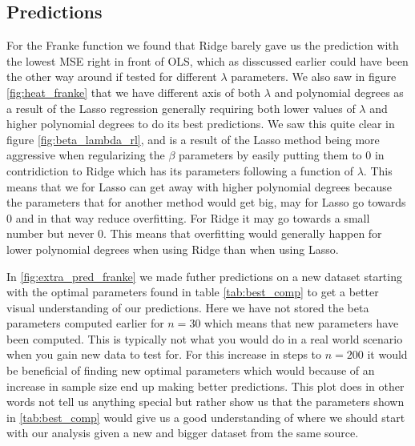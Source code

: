 \documentclass[12pt]{article}
\begin{document}
\subsection{Predictions}
For the Franke function we found that Ridge barely gave us the prediction with the lowest MSE right in front of OLS, which as disscussed earlier could have been the other way around if tested for different $\lambda$ parameters. We also saw in figure \ref{fig:heat_franke} that we have different axis of both $\lambda$ and polynomial degrees as a result of the Lasso regression generally requiring both lower values of $\lambda$ and higher polynomial degrees to do its best predictions. We saw this quite clear in figure \ref{fig:beta_lambda_rl}, and is a result of the Lasso method being more aggressive when regularizing the $\beta$ parameters by easily putting them to 0 in contridiction to Ridge which has its parameters following a function of $\lambda$. This means that we for Lasso can get away with higher polynomial degrees because the parameters that for another method would get big, may for Lasso go towards 0 and in that way reduce overfitting. For Ridge it may go towards a small number but never 0. This means that overfitting would generally happen for lower polynomial degrees when using Ridge than when using Lasso.

In \ref{fig:extra_pred_franke} we made futher predictions on a new dataset starting with the optimal parameters found in table \ref{tab:best_comp} to get a better visual understanding of our predictions. Here we have not stored the beta parameters computed earlier for $n=30$ which means that new parameters have been computed. This is typically not what you would do in a real world scenario when you gain new data to test for. For this increase in steps to $n=200$ it would be beneficial of finding new optimal parameters which would because of an increase in sample size end up making better predictions. This plot does in other words not tell us anything special but rather show us that the parameters shown in \ref{tab:best_comp} would give us a good understanding of where we should start with our analysis given a new and bigger dataset from the same source.
\end{document}
